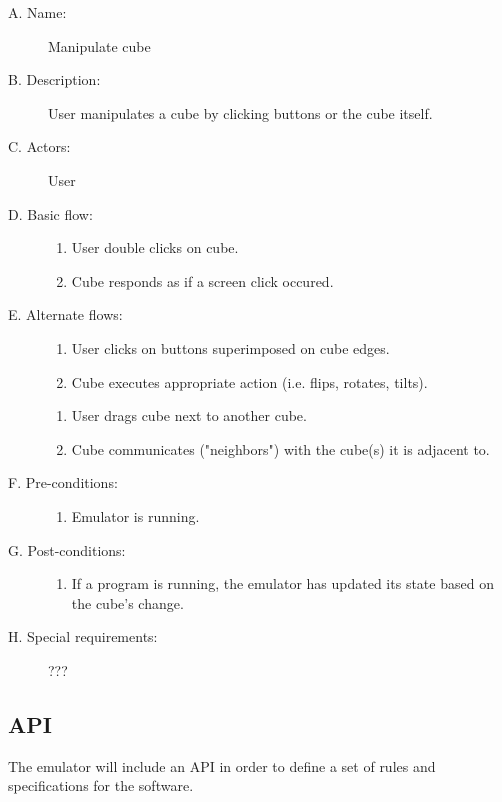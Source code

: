 \documentclass[12pt]{article}
\begin{document}
    \begin{description}
      \item[A. Name:] Manipulate cube
      \item[B. Description:] User manipulates a cube by clicking buttons or the cube itself.
      \item[C. Actors:] User
      \item[D. Basic flow:] \hfill
        \begin{enumerate}
	  \item{User double clicks on cube.}
	  \item{Cube responds as if a screen click occured.}
        \end{enumerate}
      \item[E. Alternate flows:] \hfill
        \begin{enumerate}
	  \item{User clicks on buttons superimposed on cube edges.}
	  \item{Cube executes appropriate action (i.e. flips, rotates, tilts).}
        \end{enumerate}
        \begin{enumerate}
          \item{User drags cube next to another cube.}
	  \item{Cube communicates ("neighbors") with the cube(s) it is adjacent to.}
        \end{enumerate}
      \item[F. Pre-conditions:] \hfill
        \begin{enumerate}
          \item{Emulator is running.}
        \end{enumerate}
      \item[G. Post-conditions:] \hfill
        \begin{enumerate}
	  \item{If a program is running, the emulator has updated its state based on the cube's change.}
        \end{enumerate}
      \item[H. Special requirements:] ???
    \end{description}

  \subsection{API}
    The emulator will include an API in order to define a set of rules and specifications for the software.
\end{document}
